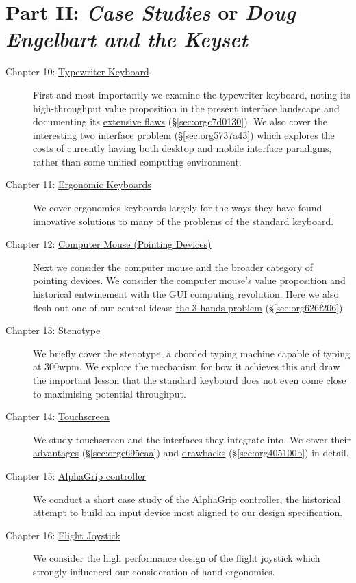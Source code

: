 \documentclass[logo,bsc,singlespacing,parskip]{infthesis}
\begin{document}
\section*{Part II: \emph{Case Studies} or \emph{Doug Engelbart and the Keyset}}
\label{sec:orgff2331c}
\begin{description}
\item[{Chapter 10: \hyperref[sec:orgf282b8b]{Typewriter Keyboard}}] First and most importantly we examine the typewriter keyboard, noting its high-throughput value proposition in the present interface landscape and documenting its \hyperref[sec:orgc7d0130]{extensive flaws} (\S \ref{sec:orgc7d0130}).
We also cover the interesting \hyperref[sec:org5737a43]{two interface problem} (\S \ref{sec:org5737a43}) which explores the costs of currently having both desktop and mobile interface paradigms, rather than some unified computing environment.

\item[{Chapter 11: \hyperref[sec:org762b633]{Ergonomic Keyboards}}] We cover ergonomics keyboards largely for the ways they have found innovative solutions to many of the problems of the standard keyboard.

\item[{Chapter 12: \hyperref[sec:orgc219d7f]{Computer Mouse (Pointing Devices)}}] Next we consider the computer mouse and the broader category of pointing devices.
We consider the computer mouse's value proposition and historical entwinement with the GUI computing revolution.
Here we also flesh out one of our central ideas: \hyperref[sec:org626f206]{the 3 hands problem} (\S \ref{sec:org626f206}).

\item[{Chapter 13: \hyperref[sec:org8b451b0]{Stenotype} }] We briefly cover the stenotype, a chorded typing machine capable of typing at 300wpm.
We explore the mechanism for how it achieves this and draw the important lesson that the standard keyboard does not even come close to maximising potential throughput.

\item[{Chapter 14:  \hyperref[sec:orgdd026f5]{Touchscreen}}] We study touchscreen and the interfaces they integrate into.
We cover their \hyperref[sec:orge695caa]{advantages} (\S \ref{sec:orge695caa}) and \hyperref[sec:org405100b]{drawbacks} (\S \ref{sec:org405100b}) in detail.

\item[{Chapter 15: \hyperref[sec:org18e4c2f]{AlphaGrip controller}}] We  conduct a short case study of the AlphaGrip controller, the historical attempt to build  an input device most aligned to our design specification.

\item[{Chapter 16: \hyperref[sec:orgf2689f0]{Flight Joystick}}] We consider the high performance design of the flight joystick which strongly influenced our consideration of hand ergonomics.
\end{description}
\end{document}
